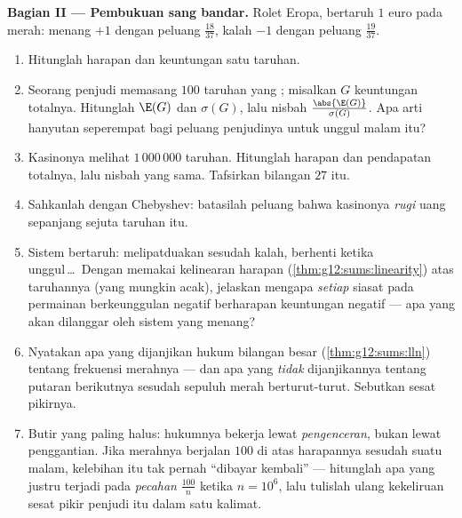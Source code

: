 \begin{problem}
\medskip
\noindent\textbf{Bagian II --- Pembukuan sang bandar.}
Rolet Eropa, bertaruh $1$ euro pada merah: menang $+1$ dengan
peluang $\frac{18}{37}$, kalah $-1$ dengan peluang
$\frac{19}{37}$.
\begin{enumerate}[resume]
  \item Hitunglah harapan dan  keuntungan satu
        taruhan.
  \item Seorang penjudi memasang $100$ taruhan yang ; misalkan $G$
        keuntungan totalnya. Hitunglah $\E(G)$ dan $\sigma(G)$, lalu
        nisbah $\frac{\abs{\E(G)}}{\sigma(G)}$. Apa arti
        hanyutan seperempat  bagi
        peluang penjudinya untuk unggul malam itu?
  \item Kasinonya melihat $1\,000\,000$ taruhan. Hitunglah
        harapan dan  pendapatan totalnya,
        lalu nisbah yang sama. Tafsirkan bilangan $27$ itu.
  \item Sahkanlah dengan Chebyshev: batasilah peluang bahwa
        kasinonya \emph{rugi} uang sepanjang sejuta taruhan itu.
  \item Sistem bertaruh: melipatduakan sesudah kalah, berhenti ketika
        unggul\,\dots\ Dengan memakai kelinearan harapan
        (\cref{thm:g12:sums:linearity}) atas  taruhannya (yang
        mungkin acak), jelaskan mengapa \emph{setiap}
        siasat pada permainan berkeunggulan negatif berharapan keuntungan
        negatif --- apa yang akan dilanggar oleh sistem yang menang?
  \item Nyatakan apa yang dijanjikan hukum bilangan besar
        (\cref{thm:g12:sums:lln}) tentang frekuensi
        merahnya --- dan apa yang \emph{tidak} dijanjikannya tentang
        putaran berikutnya sesudah sepuluh merah berturut-turut. Sebutkan
        sesat pikirnya.
  \item Butir yang paling halus: hukumnya bekerja lewat \emph{pengenceran},
        bukan lewat penggantian. Jika merahnya berjalan $100$ di atas
        harapannya sesudah suatu malam, kelebihan itu tak pernah
        ``dibayar kembali'' --- hitunglah apa yang justru terjadi pada
        \emph{pecahan} $\frac{100}{n}$ ketika $n = 10^6$, lalu
        tulislah ulang kekeliruan sesat pikir penjudi itu dalam satu kalimat.
\end{enumerate}


\end{problem}
